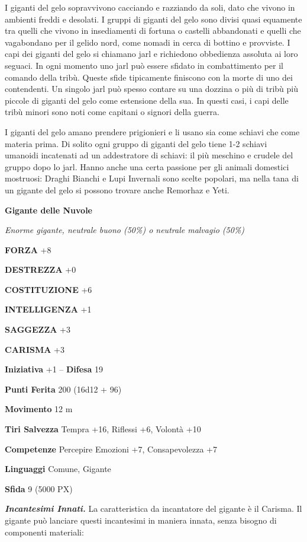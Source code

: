 \begin{multicols}{2}
	I giganti del gelo sopravvivono cacciando e razziando da soli, dato che vivono in ambienti freddi e desolati. I gruppi di giganti del gelo sono divisi quasi equamente tra quelli che vivono in insediamenti di fortuna o castelli abbandonati e quelli che vagabondano per il gelido nord, come nomadi in cerca di bottino e provviste. I capi dei giganti del gelo si chiamano jarl e richiedono obbedienza assoluta ai loro seguaci. In ogni momento uno jarl può essere sfidato in combattimento per il comando della tribù. Queste sfide tipicamente finiscono con la morte di uno dei contendenti. Un singolo jarl può spesso contare su una dozzina o più di tribù più piccole di giganti del gelo come estensione della sua. In questi casi, i capi delle tribù minori sono noti come capitani o signori della guerra.

	I giganti del gelo amano prendere prigionieri e li usano sia come schiavi che come materia prima. Di solito ogni gruppo di giganti del gelo tiene 1-2 schiavi umanoidi incatenati ad un addestratore di schiavi: il più meschino e crudele del gruppo dopo lo jarl. Hanno anche una certa passione per gli animali domestici mostruosi: Draghi Bianchi e Lupi Invernali sono scelte popolari, ma nella tana di un gigante del gelo si possono trovare anche Remorhaz e Yeti.

	\medskip{}\textbf{Gigante delle Nuvole}

	\textit{Enorme gigante, neutrale buono (50\%) o neutrale malvagio (50\%)}

	\textbf{FORZA} +8

	\textbf{DESTREZZA} +0

	\textbf{COSTITUZIONE} +6

	\textbf{INTELLIGENZA} +1

	\textbf{SAGGEZZA} +3

	\textbf{CARISMA} +3

	\textbf{Iniziativa} +1 -- \textbf{Difesa} 19

	\textbf{Punti Ferita} 200 (16d12 + 96)

	\textbf{Movimento} 12 m

	\textbf{Tiri Salvezza} Tempra +16, Riflessi +6, Volontà +10

	\textbf{Competenze} Percepire Emozioni +7, Consapevolezza +7

	\textbf{Linguaggi} Comune, Gigante

	\textbf{Sfida} 9 (5000 PX)

	\textit{\textbf{Incantesimi Innati.}} La caratteristica da incantatore del gigante è il Carisma. Il gigante può lanciare questi incantesimi in maniera innata, senza bisogno di componenti materiali:


\end{multicols}

